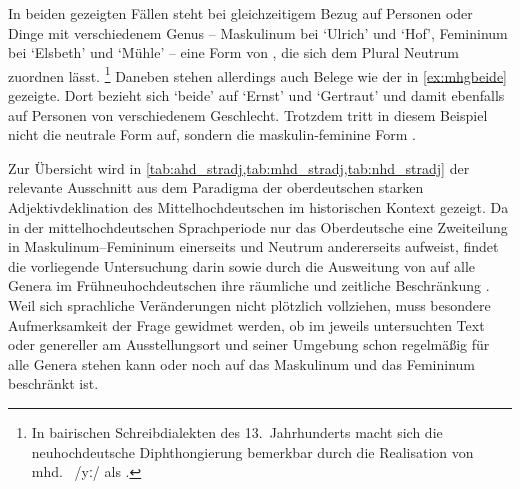 In beiden gezeigten Fällen steht bei gleichzeitigem Bezug auf Personen oder
Dinge mit verschiedenem Genus -- Maskulinum bei  `Ulrich' und
 `Hof', Femininum bei  `Elsbeth' und 
`Mühle' -- eine Form von , die sich dem Plural Neutrum
 zuordnen lässt.%
%
	\footnote{In bairischen Schreibdialekten des 13.~Jahrhunderts macht sich
		die neuhochdeutsche Diphthongierung bemerkbar durch die Realisation von
		mhd.~ /yː/ als  \autocites[74--77]{paul2007}.
	}
%
Daneben stehen allerdings auch Belege wie der in \cref{ex:mhgbeide} gezeigte.
Dort bezieht sich  `beide' auf  `Ernst' und
 `Gertraut' und damit ebenfalls auf Personen von
verschiedenem Geschlecht. Trotzdem tritt in diesem Beispiel nicht die neutrale
Form  auf, sondern die maskulin-feminine Form .


Zur Übersicht wird in \cref{tab:ahd_stradj,tab:mhd_stradj,tab:nhd_stradj} der
relevante Ausschnitt aus dem Paradigma der oberdeutschen starken
Adjektivdeklination des Mittelhochdeutschen im historischen Kontext gezeigt. Da
in der mittelhochdeutschen Sprachperiode nur das Oberdeutsche eine Zweiteilung
in Maskulinum--Femininum einerseits und Neutrum andererseits aufweist, findet
die vorliegende Untersuchung darin sowie durch die Ausweitung von  auf
alle Genera im Früh\-neu\-hoch\-deutschen ihre räumliche und zeitliche
Beschränkung \autocites[vgl.][191--192]{reichmannwegera1993}[181--184]{ksw2}.
Weil sich sprachliche Veränderungen nicht plötzlich vollziehen, muss besondere
Aufmerksamkeit der Frage gewidmet werden, ob  im jeweils untersuchten
Text oder genereller am Ausstellungsort und seiner Umgebung schon regelmäßig
für alle Genera stehen kann oder noch auf das Maskulinum und das Femininum
beschränkt ist.

